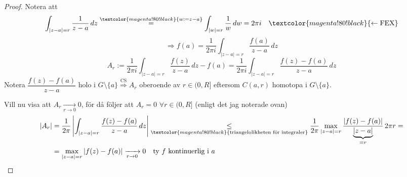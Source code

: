 \begin{proof}
Notera att
\[ \int_{|z - a| = r} \frac{1}{z - a}\,dz \overset{\textcolor{magenta!80!black}{w := z - a}}{=} \int_{|w| = r} \frac{1}{w}\,dw = 2\pi i \quad \textcolor{magenta!80!black}{\leftarrow \text{FEX}} \]
\[ \Rightarrow f(a) = \frac{1}{2\pi i}\int_{|z - a| = r} \frac{f(a)}{z - a}\,dz \]
\[ A_r := \frac{1}{2\pi i}\int_{|z - a| = r} \frac{f(z)}{z - a}\,dz - f(a) = \frac{1}{2\pi i}\int_{|z - a| = r} \frac{f(z) - f(a)}{z - a}\,dz \]
Notera $\dfrac{f(z) - f(a)}{z - a}$ holo i $G \setminus \{a\} \overset{\text{CS}}{\Rightarrow} A_r$ oberoende av $r \in (0, R]$ eftersom $C(a, r)$ homotopa i $G \setminus \{a\}$.

Vill nu visa att $A_r \xrightarrow[r \to 0]{} 0$, för då följer att $A_r = 0$ $\forall r \in (0, R]$ (enligt det jag noterade ovan)
\begin{align*}
|A_r| &= \frac{1}{2\pi}\left| \int_{|z - a| = r} \frac{f(z) - f(a)}{z - a}\,dz \right| \underset{\textcolor{magenta!80!black}{\text{triangelolikheten för integraler}}}{\le} \frac{1}{2\pi}\max_{|z - a| = r} \frac{|f(z) - f(a)|}{\underbrace{|z - a|}_{= r}}\,2\pi r = \\
&= \max_{|z - a| = r} |f(z) - f(a)| \xrightarrow[r \to 0]{} 0 \quad \text{ty } f \text{ kontinuerlig i } a
\end{align*}
\end{proof}
